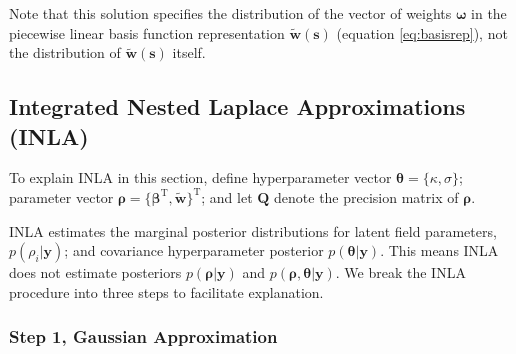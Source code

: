 Note that this solution specifies the distribution of the vector of weights $\pmb{\omega}$ in the piecewise linear basis function representation $\widetilde{\pmb{w}}(\pmb{s})$ (equation \ref{eq:basisrep}), not the distribution of $\widetilde{\pmb{w}}(\pmb{s})$ itself.

\subsection{Integrated Nested Laplace Approximations (INLA)}

To explain INLA in this section, define hyperparameter vector $\pmb{\theta} = \{\kappa, \sigma \}$; parameter vector $\pmb{\rho} = \{ \pmb{\beta}^{\text{T}}, \widetilde{\pmb{w}} \}^{\text{T}}$; and let $\pmb{Q}$ denote the precision matrix of $\pmb{\rho}$.

INLA estimates the marginal posterior distributions for latent field parameters, $p(\rho_{i}|\pmb{y})$; and covariance hyperparameter posterior $p(\pmb{\theta}|\pmb{y})$. This means INLA does not estimate posteriors $p(\pmb{\rho}|\pmb{y})$ and $p(\pmb{\rho},\pmb{\theta}|\pmb{y})$. We break the INLA procedure into three steps to facilitate explanation.

\subsubsection{Step 1, Gaussian Approximation} %

